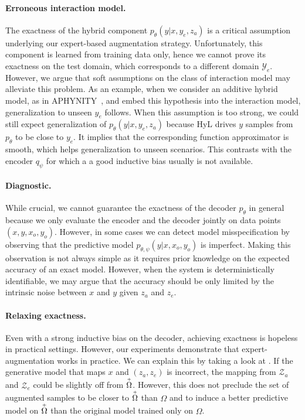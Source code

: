 \paragraph{Erroneous interaction model.}
The exactness of the hybrid component $p_\theta(y|x, y_e, z_a)$ is a critical assumption underlying our expert-based augmentation strategy. Unfortunately, this component is learned from training data only, hence we cannot prove its exactness on the test domain, which corresponds to a different domain $\mathcal{Y}_e$. However, we argue that soft assumptions on the class of interaction model may alleviate this problem. As an example, when we consider an additive hybrid model, as in APHYNITY~\citep{APHYNITY}, and embed this hypothesis into the interaction model, generalization to unseen $y_e$ follows. When this assumption is too strong, we could still expect generalization of $p_\theta(y|x, y_e, z_a)$ because HyL drives $y$ samples from $p_\theta$ to be close to $y_e$. It implies that the corresponding function approximator is smooth, which helps generalization to unseen scenarios. This contrasts with the encoder $q_\psi$ for which a a good inductive bias usually is not available.
\paragraph{Diagnostic.}
While crucial, we cannot guarantee the exactness of the decoder $p_\theta$ in general because we only evaluate the encoder and the decoder jointly on data points $(x, y, x_o, y_o)$. However, in some cases we can detect model misspecification by observing that the predictive model $p_{\theta, \psi}(y|x, x_o, y_o)$ is imperfect. Making this observation is not always simple as it requires prior knowledge on the expected accuracy of an exact model. However, when the system is deterministically identifiable, we may argue that the accuracy should be only limited by the intrinsic noise between $x$ and $y$ given $z_a$ and $z_e$.

\paragraph{Relaxing exactness.}
Even with a strong inductive bias on the decoder, achieving exactness is hopeless in practical settings. However, our experiments demonstrate that expert-augmentation works in practice. We can explain this by taking a look at . If the generative model that maps $x$ and $(z_a, z_e)$ is incorrect, the mapping from $\mathcal{Z}_a$ and $\mathcal{Z}_e$ could be slightly off from $\accentset{+}{\Omega}$.  However, this does not preclude the set of augmented samples to be closer to $\accentset{+}{\Omega}$ than $\Omega$ and to induce a better predictive model on $\accentset{+}{\Omega}$ than the original model trained only on $\Omega$.

